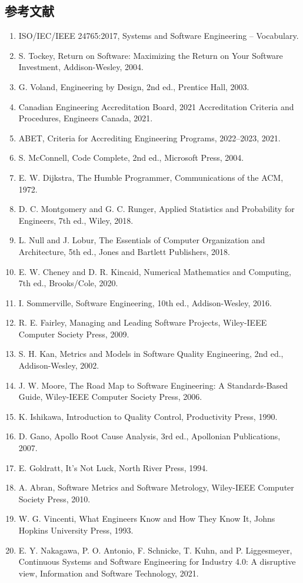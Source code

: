 \subsection{参考文献}
\begin{enumerate}[leftmargin=2em]
\item ISO/IEC/IEEE 24765:2017, Systems and Software Engineering – Vocabulary.
\item S. Tockey, Return on Software: Maximizing the Return on Your Software Investment, Addison-Wesley, 2004.
\item G. Voland, Engineering by Design, 2nd ed., Prentice Hall, 2003.
\item Canadian Engineering Accreditation Board, 2021 Accreditation Criteria and Procedures, Engineers Canada, 2021.
\item ABET, Criteria for Accrediting Engineering Programs, 2022–2023, 2021.
\item S. McConnell, Code Complete, 2nd ed., Microsoft Press, 2004.
\item E. W. Dijkstra, The Humble Programmer, Communications of the ACM, 1972.
\item D. C. Montgomery and G. C. Runger, Applied Statistics and Probability for Engineers, 7th ed., Wiley, 2018.
\item L. Null and J. Lobur, The Essentials of Computer Organization and Architecture, 5th ed., Jones and Bartlett Publishers, 2018.
\item E. W. Cheney and D. R. Kincaid, Numerical Mathematics and Computing, 7th ed., Brooks/Cole, 2020.
\item I. Sommerville, Software Engineering, 10th ed., Addison-Wesley, 2016.
\item R. E. Fairley, Managing and Leading Software Projects, Wiley-IEEE Computer Society Press, 2009.
\item S. H. Kan, Metrics and Models in Software Quality Engineering, 2nd ed., Addison-Wesley, 2002.
\item J. W. Moore, The Road Map to Software Engineering: A Standards-Based Guide, Wiley-IEEE Computer Society Press, 2006.
\item K. Ishikawa, Introduction to Quality Control, Productivity Press, 1990.
\item D. Gano, Apollo Root Cause Analysis, 3rd ed., Apollonian Publications, 2007.
\item E. Goldratt, It’s Not Luck, North River Press, 1994.
\item A. Abran, Software Metrics and Software Metrology, Wiley-IEEE Computer Society Press, 2010.
\item W. G. Vincenti, What Engineers Know and How They Know It, Johns Hopkins University Press, 1993.
\item E. Y. Nakagawa, P. O. Antonio, F. Schnicke, T. Kuhn, and P. Liggesmeyer, Continuous Systems and Software Engineering for Industry 4.0: A disruptive view, Information and Software Technology, 2021.
\end{enumerate}
